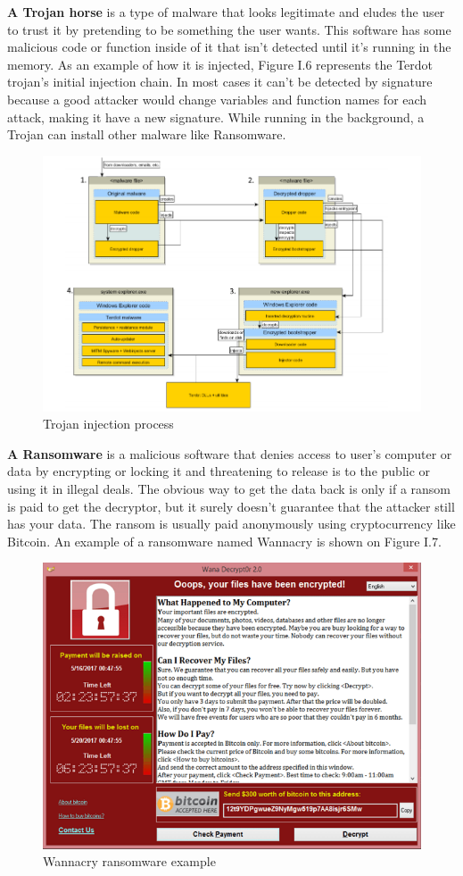 \textbf{A Trojan horse} is a type of malware that looks legitimate and eludes the user to trust it by pretending to be something the user wants. This software has some malicious code or function inside of it that isn't detected until it's running in the memory. As an example of how it is injected, Figure I.6 represents the Terdot trojan's initial injection chain. In most cases it can't be detected by signature because a good attacker would change variables and function names for each attack, making it have a new signature. While running in the background, a Trojan can install other malware like Ransomware.
\begin{figure}[H]
\centering
\includegraphics[width=0.6\columnwidth]{Figures/trojan.png}
\caption{Trojan injection process \cite{trojan}}
\end{figure}
\textbf{A Ransomware} is a malicious software that denies access to user's computer or data by encrypting or locking it and threatening to release is to the public or using it in illegal deals. The obvious way to get the data back is only if a ransom is paid to get the decryptor, but it surely doesn't guarantee that the attacker still has your data. The ransom is usually paid anonymously using cryptocurrency like Bitcoin. An example of a ransomware named Wannacry is shown on Figure I.7.
\begin{figure}[H]
\centering
\includegraphics[width=0.7\columnwidth]{Figures/ransomware.png}
\caption{Wannacry ransomware example \cite{ransomware}}
\end{figure}



